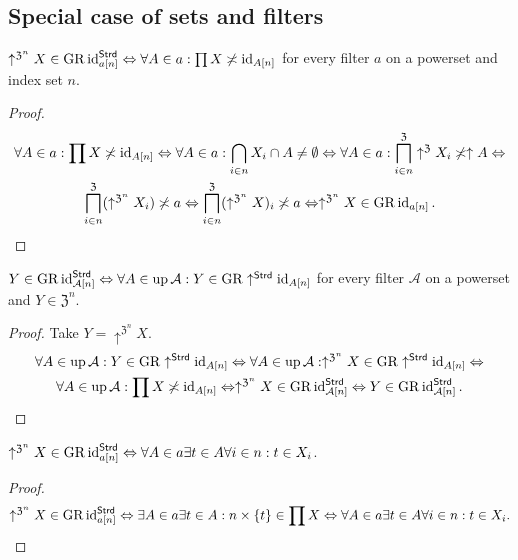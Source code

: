 \subsection{Special case of sets and filters}
\begin{prop}
$\uparrow^{\mathfrak{Z}^{n}}X\in\operatorname{GR}\operatorname{id}_{a[n]}^{\mathsf{Strd}}\Leftrightarrow\forall A\in a:\prod X\not\asymp\operatorname{id}_{A[n]}$
for every filter $a$ on a powerset and index set $n$.\end{prop}
\begin{proof}
~
\begin{multline*}
\forall A\in a:\prod X\not\asymp\operatorname{id}_{A[n]}\Leftrightarrow\forall A\in a:\bigcap_{i\in n}X_{i}\cap A\neq\emptyset\Leftrightarrow\forall A\in a:\bigsqcap_{i\in n}^{\mathfrak{Z}}\uparrow^{\mathfrak{Z}}X_{i}\not\asymp\uparrow A\Leftrightarrow\\
\bigsqcap_{i\in n}^{\mathfrak{Z}}(\uparrow^{\mathfrak{Z}^{n}}X_{i})\not\asymp a\Leftrightarrow\bigsqcap_{i\in n}^{\mathfrak{Z}}(\uparrow^{\mathfrak{Z}^{n}}X)_{i}\not\asymp a\Leftrightarrow\uparrow^{\mathfrak{Z}^{n}}X\in\operatorname{GR}\operatorname{id}_{a[n]}.
\end{multline*}
\end{proof}
\begin{prop}
$Y\in\operatorname{GR}\operatorname{id}_{\mathcal{A}[n]}^{\mathsf{Strd}}\Leftrightarrow\forall A\in\operatorname{up}\mathcal{A}:Y\in\operatorname{GR}\uparrow^{\mathsf{Strd}}\operatorname{id}_{A[n]}$
for every filter $\mathcal{A}$ on a powerset and $Y\in\mathfrak{Z}^{n}$.\end{prop}
\begin{proof}
Take $Y=\uparrow^{\mathfrak{Z}^{n}}X$.
\begin{multline*}
\forall A\in\operatorname{up}\mathcal{A}:Y\in\operatorname{GR}\uparrow^{\mathsf{Strd}}\operatorname{id}_{A[n]}\Leftrightarrow\forall A\in\operatorname{up}\mathcal{A}:\uparrow^{\mathfrak{Z}^{n}}X\in\operatorname{GR}\uparrow^{\mathsf{Strd}}\operatorname{id}_{A[n]}\Leftrightarrow\\
\forall A\in\operatorname{up}\mathcal{A}:\prod X\not\asymp\operatorname{id}_{A[n]}\Leftrightarrow\uparrow^{\mathfrak{Z}^{n}}X\in\operatorname{GR}\operatorname{id}_{\mathcal{A}[n]}^{\mathsf{Strd}}\Leftrightarrow Y\in\operatorname{GR}\operatorname{id}_{\mathcal{A}[n]}^{\mathsf{Strd}}.
\end{multline*}
\end{proof}
\begin{prop}
$\uparrow^{\mathfrak{Z}^{n}}X\in\operatorname{GR}\operatorname{id}_{a[n]}^{\mathsf{Strd}}\Leftrightarrow\forall A\in a\exists t\in A\forall i\in n:t\in X_{i}$.\end{prop}
\begin{proof}
~
\[
\uparrow^{\mathfrak{Z}^{n}}X\in\operatorname{GR}\operatorname{id}_{a[n]}^{\mathsf{Strd}}\Leftrightarrow\exists A\in a\exists t\in A:n\times\{t\}\in\prod X\Leftrightarrow\forall A\in a\exists t\in A\forall i\in n:t\in X_{i}.
\]

\end{proof}

